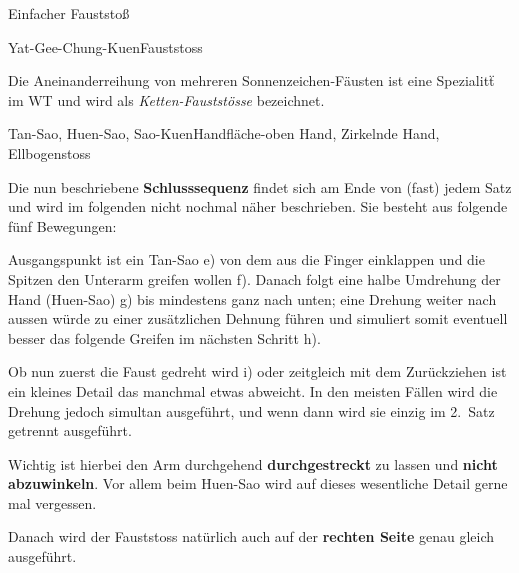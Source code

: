 \begin{WTSatz}{Einfacher Fauststo{\ss}}
\begin{WTSatzTeil}{Yat-Gee-Chung-Kuen}{Fauststoss}
\begin{WTCommonBegriff}
		Die Aneinanderreihung von mehreren Sonnenzeichen-F\"austen ist eine Spezialit\"t im WT und wird als \textit{Ketten-Faustst\"osse} bezeichnet. %
	\end{WTCommonBegriff}
			
		
	\end{WTSatzTeil}
	\begin{WTSatzTeil}{Tan-Sao, Huen-Sao, Sao-Kuen}{Handfl\"ache-oben Hand, Zirkelnde Hand, Ellbogenstoss}
	
		Die nun beschriebene \textbf{Schlusssequenz} findet sich am Ende von (fast) jedem Satz und wird im folgenden nicht nochmal n\"aher beschrieben. Sie besteht aus folgende f\"unf Bewegungen:
		
		
		Ausgangspunkt ist ein Tan-Sao e) von dem aus die Finger einklappen und die Spitzen den Unterarm greifen wollen f). Danach folgt eine halbe Umdrehung der Hand (Huen-Sao) g) bis mindestens ganz nach unten; eine Drehung weiter nach aussen w\"urde zu einer zus\"atzlichen Dehnung f\"uhren und simuliert somit eventuell besser das folgende Greifen im n\"achsten Schritt h).
		
		
		Ob nun zuerst die Faust gedreht wird i) oder zeitgleich mit dem Zur\"uckziehen ist ein kleines Detail das manchmal etwas abweicht. In den meisten F\"allen wird die Drehung jedoch simultan ausgef\"uhrt, und wenn dann wird sie einzig im 2.~Satz getrennt ausgef\"uhrt.
		
	\begin{WTCommonNoob}
		Wichtig ist hierbei den Arm durchgehend \textbf{durchgestreckt} zu lassen und \textbf{nicht abzuwinkeln}. Vor allem beim Huen-Sao wird auf dieses wesentliche Detail gerne mal vergessen.
	\end{WTCommonNoob}
	
		
	Danach wird der Fauststoss nat\"urlich auch auf der \textbf{rechten Seite} genau gleich ausgef\"uhrt.
	
	\end{WTSatzTeil}
\end{WTSatz}



